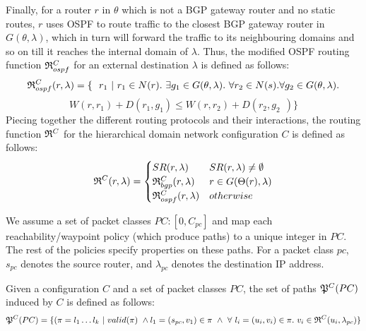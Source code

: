 Finally, for a router $r$ in $\theta$ which is not a BGP gateway 
router and no static routes, $r$ uses OSPF to route traffic to the closest BGP
gateway router in $G (\theta, \lambda)$, which in turn will forward  the traffic to its neighbouring domains and so on till it reaches the internal domain of $\lambda$.  Thus, the modified OSPF routing 
function $\mathfrak{R}^C_{ospf}$ for an external destination $\lambda$
is defined as follows: 
\[
\mathfrak{R}_{ospf}^C(r,\lambda) = \{~~r_1 ~|~ r_1 \in N(r). ~\exists g_1 \in G (\theta, \lambda). ~\forall r_2 \in N(s). \forall g_2 \in G (\theta, \lambda). 
\]
\[ 
W(r, r_1) + D(r_1, g_1) \leq
W(r, r_2) + D(r_2, g_2~~)\}
\]
Piecing together the different routing protocols and their 
interactions, the routing function 
$\mathfrak{R}^C$ for the hierarchical domain network configuration $C$ is defined as follows: 
\[
\mathfrak{R}^C(r, \lambda) = 
\begin{cases}
SR(r, \lambda) & SR(r, \lambda) \not= \emptyset \\
\mathfrak{R}_{bgp}^C(r, \lambda) & r \in G(\Theta(r), \lambda) \\
\mathfrak{R}_{ospf}^C(r, \lambda) & otherwise 
\end{cases}
\]

We assume a set of packet classes $PC : [0,C_{pc}]$ 
and map each reachability/waypoint policy (which produce paths) 
to a unique integer in $PC$. The rest of the policies specify 
properties on these paths. 
For a packet class $pc$, $s_{pc}$ denotes the source router, 
and $\lambda_{pc}$
denotes the destination IP address. 

\begin{definition} \label{def:inducedpaths}
Given a configuration $C$ and a set of packet classes $PC$, the set of paths
$\mathfrak{P}^C(PC)$ induced by $C$ is defined as follows: 
\[
\mathfrak{P}^C(PC) = \{(\pi=l_1\ldots l_k ~|~ valid(\pi) ~\wedge l_1 = (s_{pc}, v_1) \in \pi  ~\wedge ~\forall ~l_i=(u_i, v_i) \in \pi. ~v_i \in \mathfrak{R}^C(u_i,\lambda_{pc})\}
\]
\end{definition}

